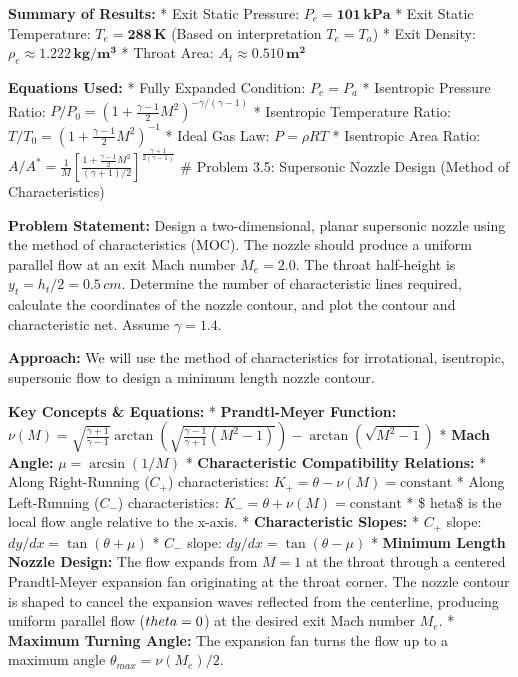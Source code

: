 \textbf{Summary of Results:} * Exit Static Pressure:
\(P_e = \mathbf{101 \, kPa}\) * Exit Static Temperature:
\(T_e = \mathbf{288 \, K}\) (Based on interpretation \(T_e=T_a\)) * Exit
Density: \(\rho_e \approx \mathbf{1.222 \, kg/m^3}\) * Throat Area:
\(A_t \approx \mathbf{0.510 \, m^2}\)

\textbf{Equations Used:} * Fully Expanded Condition: \(P_e = P_a\) *
Isentropic Pressure Ratio:
\(P/P_0 = (1 + \frac{\gamma-1}{2} M^2)^{-\gamma/(\gamma-1)}\) *
Isentropic Temperature Ratio:
\(T/T_0 = (1 + \frac{\gamma-1}{2} M^2)^{-1}\) * Ideal Gas Law:
\(P = \rho R T\) * Isentropic Area Ratio:
\(A/A^* = \frac{1}{M} [\frac{1 + \frac{\gamma-1}{2} M^2}{(\gamma+1)/2}]^{\frac{\gamma+1}{2(\gamma-1)}}\)
\# Problem 3.5: Supersonic Nozzle Design (Method of Characteristics)

\textbf{Problem Statement:} Design a two-dimensional, planar supersonic
nozzle using the method of characteristics (MOC). The nozzle should
produce a uniform parallel flow at an exit Mach number \(M_e = 2.0\).
The throat half-height is \(y_t = h_t/2 = 0.5 \, cm\). Determine the
number of characteristic lines required, calculate the coordinates of
the nozzle contour, and plot the contour and characteristic net. Assume
\(\gamma = 1.4\).

\textbf{Approach:} We will use the method of characteristics for
irrotational, isentropic, supersonic flow to design a minimum length
nozzle contour.

\textbf{Key Concepts \& Equations:} * \textbf{Prandtl-Meyer Function:}
\(\nu(M) = \sqrt{\frac{\gamma+1}{\gamma-1}} \arctan\left( \sqrt{\frac{\gamma-1}{\gamma+1}(M^2-1)} \right) - \arctan\left( \sqrt{M^2-1} \right)\)
* \textbf{Mach Angle:} \(\mu = \arcsin(1/M)\) * \textbf{Characteristic
Compatibility Relations:} * Along Right-Running (\(C_+\))
characteristics: \(K_+ = \theta - \nu(M) = \text{constant}\) * Along
Left-Running (\(C_-\)) characteristics:
\(K_- = \theta + \nu(M) = \text{constant}\) * \$ heta\$ is the local
flow angle relative to the x-axis. * \textbf{Characteristic Slopes:} *
\(C_+\) slope: \(dy/dx = \tan(\theta + \mu)\) * \(C_-\) slope:
\(dy/dx = \tan(\theta - \mu)\) * \textbf{Minimum Length Nozzle Design:}
The flow expands from \(M=1\) at the throat through a centered
Prandtl-Meyer expansion fan originating at the throat corner. The nozzle
contour is shaped to cancel the expansion waves reflected from the
centerline, producing uniform parallel flow (\(\\theta=0\)) at the
desired exit Mach number \(M_e\). * \textbf{Maximum Turning Angle:} The
expansion fan turns the flow up to a maximum angle
\(\theta_{max} = \nu(M_e) / 2\).

